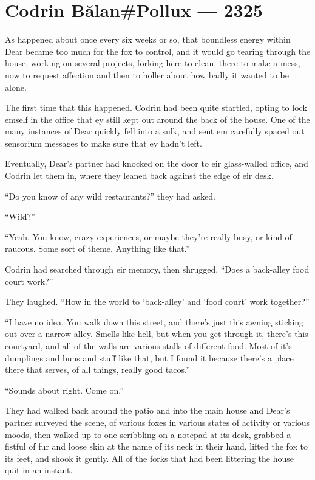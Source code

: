 \hypertarget{codrin-bux103lanpollux-2325}{%
\chapter{Codrin Bălan\#Pollux — 2325}\label{codrin-bux103lanpollux-2325}}

As happened about once every six weeks or so, that boundless energy within Dear became too much for the fox to control, and it would go tearing through the house, working on several projects, forking here to clean, there to make a mess, now to request affection and then to holler about how badly it wanted to be alone.

The first time that this happened. Codrin had been quite startled, opting to lock emself in the office that ey still kept out around the back of the house. One of the many instances of Dear quickly fell into a sulk, and sent em carefully spaced out sensorium messages to make sure that ey hadn't left.

Eventually, Dear's partner had knocked on the door to eir glass-walled office, and Codrin let them in, where they leaned back against the edge of eir desk.

``Do you know of any wild restaurants?'' they had asked.

``Wild?''

``Yeah. You know, crazy experiences, or maybe they're really busy, or kind of raucous. Some sort of theme. Anything like that.''

Codrin had searched through eir memory, then shrugged. ``Does a back-alley food court work?''

They laughed. ``How in the world to `back-alley' and `food court' work together?''

``I have no idea. You walk down this street, and there's just this awning sticking out over a narrow alley. Smells like hell, but when you get through it, there's this courtyard, and all of the walls are various stalls of different food. Most of it's dumplings and buns and stuff like that, but I found it because there's a place there that serves, of all things, really good tacos.''

``Sounds about right. Come on.''

They had walked back around the patio and into the main house and Dear's partner surveyed the scene, of various foxes in various states of activity or various moods, then walked up to one scribbling on a notepad at its desk, grabbed a fistful of fur and loose skin at the name of its neck in their hand, lifted the fox to its feet, and shook it gently. All of the forks that had been littering the house quit in an instant.

